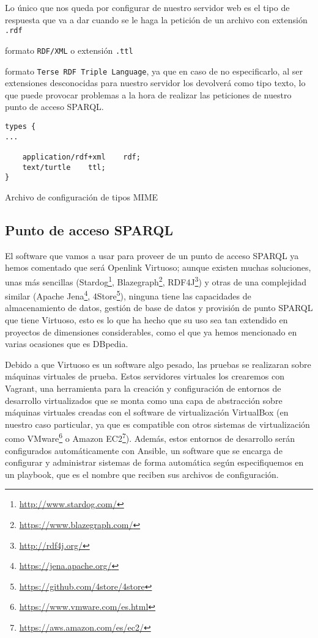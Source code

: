 Lo único que nos queda por configurar de nuestro servidor web es el tipo de respuesta que va a dar cuando se le haga la petición de un archivo con extensión {\tt .rdf} {formato {\tt RDF/XML} o extensión {\tt .ttl} {formato {\tt Terse RDF Triple Language}, ya que en caso de no especificarlo, al ser extensiones desconocidas para nuestro servidor los devolverá como tipo texto, lo que puede provocar problemas a la hora de realizar las peticiones de nuestro punto de acceso {\sf SPARQL}.

\bigskip
\begin{listing}[!ht]
\begin{verbatim}
types {
...

    application/rdf+xml    rdf;
    text/turtle    ttl;
}
\end{verbatim}
\caption{Archivo de configuración de tipos {\sf MIME}}
\end{listing}

\newpage
\subsection{Punto de acceso SPARQL}

El software que vamos a usar para proveer de un punto de acceso {\sf SPARQL} ya hemos comentado que será {\sf Openlink Virtuoso}; aunque existen muchas soluciones, unas más sencillas ({\sf Stardog}\footnote{\url{http://www.stardog.com/}}, {\sf Blazegraph}\footnote{\url{https://www.blazegraph.com/}}, {\sf RDF4J}{\footnote{\url{http://rdf4j.org/}}}) y otras de una complejidad similar ({\sf Apache Jena}{\footnote{\url{https://jena.apache.org/}}}, {\sf 4Store}\footnote{\url{https://github.com/4store/4store}}), ninguna tiene las capacidades de almacenamiento de datos, gestión de base de datos y provisión de punto {\sf SPARQL} que tiene Virtuoso, esto es lo que ha hecho que su uso sea tan extendido en proyectos de dimensiones considerables, como el que ya hemos mencionado en varias ocasiones que es {\sf DBpedia}.

\bigskip
Debido a que Virtuoso es un software algo pesado, las pruebas se realizaran sobre máquinas virtuales de prueba. Estos servidores virtuales los crearemos con {\sf Vagrant}, una herramienta para la creación y configuración de entornos de desarrollo virtualizados que se monta como una capa de abstracción sobre máquinas virtuales creadas con el software de virtualización {\sf VirtualBox} (en nuestro caso particular, ya que es compatible con otros sistemas de virtualización como {\sf VMware\footnote{\url{https://www.vmware.com/es.html}}} o {\sf Amazon EC2\footnote{\url{https://aws.amazon.com/es/ec2/}}}). Además, estos entornos de desarrollo serán configurados automáticamente con {\sf Ansible}, un software que se encarga de configurar y administrar sistemas de forma automática según especifiquemos en un {\sf playbook}, que es el nombre que reciben sus archivos de configuración.

}}

